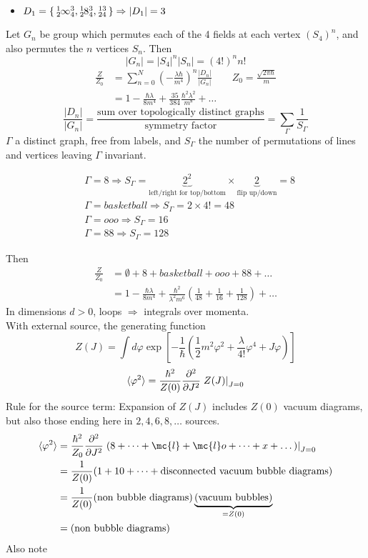 \documentclass{article}
\begin{document}
\begin{itemize}
    \item $D_1 = \set{\tensor*[^1_2]{\infty}{^3_4},\tensor*[^1_2]{8}{^3_4}, \tensor*[^1_2]{}{^3_4} } \Rightarrow |D_1| = 3$
\end{itemize}
Let $G_n$ be group which permutes each of the 4 fields at each vertex $(S_4)^n$, and also permutes the $n$ vertices $S_n$. Then 
\[
|G_n| = |S_4|^n |S_n| = (4!)^n n!
\]
\begin{align*}
\frac{Z}{Z_0} &= \sum_{n=0}^N \left(-\frac{\lambda\hbar}{m^4} \right)^n \frac{|D_n|}{|G_n|} \qquad Z_0 =\frac{\sqrt{2\pi\hbar}}{m} \\
&= 1 - \frac{\hbar\lambda}{8m^4} + \frac{35}{384}\frac{\hbar^2 \lambda^2}{m^8}+\dots
\end{align*}
\[
\frac{|D_n|}{|G_n|} = \frac{\text{sum over topologically distinct graphs}}{\text{symmetry factor}} = \sum_{\Gamma} \frac{1}{S_\Gamma}
\]
$\Gamma$ a distinct graph, free from labels, and $S_\Gamma$ the number of permutations of lines and vertices leaving $\Gamma$ invariant. 

\begin{example}
\begin{align*}
&\Gamma = 8 \Rightarrow S_\Gamma = \underbrace{2^2}_{\text{left/right for top/bottom}} \times \underbrace{2}_{\text{flip up/down}}=8 \\
&\Gamma = basketball \Rightarrow S_\Gamma = 2 \times 4! = 48 \\
&\Gamma = ooo \Rightarrow S_\Gamma = 16 \\
&\Gamma = 8 8 \Rightarrow S_\Gamma = 128
\end{align*}
\end{example}
Then 
\begin{align*}
    \frac{Z}{Z_0} &= \emptyset + 8 + basketball + ooo + 8 8 + \dots \\
    &= 1 - \frac{\hbar\lambda}{8m^4} + \frac{\hbar^2}{\lambda^2 m^6} \left( \frac{1}{48} + \frac{1}{16} + \frac{1}{128} \right) + \dots 
\end{align*}
In dimensions $d>0$, loops $\Rightarrow$ integrals over momenta. \\
With external source, the generating function 
\[
Z(J) = \int d\varphi \exp \left[-\frac{1}{\hbar} \left( \frac{1}{2}m^2 \varphi^2 + \frac{\lambda}{4!}\varphi^4 + J\varphi \right) \right]
\]
\[
\braket{\varphi^2} = \frac{\hbar^2}{Z(0)} \frac{\partial^2 }{\partial J^2} \left. Z(J) \right \rvert_{J=0}
\]
Rule for the source term: Expansion of $Z(J)$ includes $Z(0)$ vacuum diagrams, but also those ending here in $2,4,6,8,\dots$ sources. 
\begin{align*}
\braket{\varphi^2} &= \frac{\hbar^2}{Z_0} \pds{J} \left.\left( 8 + \dots + \mc{l} + \mc{l}o +\dots +x+\dots \right)\right\rvert_{J=0} \\
&= \frac{1}{Z(0)} (1 + 10 + \dots + \text{disconnected vacuum bubble diagrams}) \\
&= \frac{1}{Z(0)} (\text{non bubble diagrams})\underbrace{(\text{vacuum bubbles})}_{=Z(0)} \\
&= (\text{non bubble diagrams})
\end{align*}
Also note 
\end{document}
